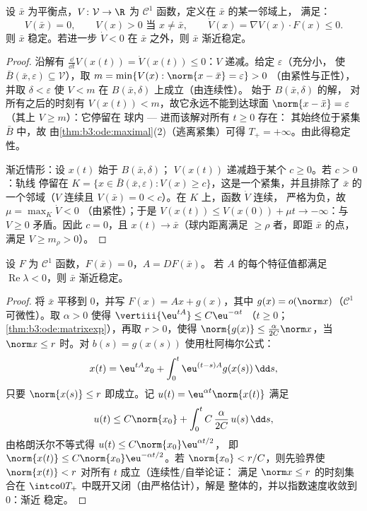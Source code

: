 \begin{theorem}[李雅普诺夫函数]\label{thm:b3:ode:lyapunov}
设 $\bar x$ 为平衡点，$V \colon \mathcal V \to
\R$ 为 $\mathcal C^1$ 函数，定义在 $\bar x$ 的某一邻域上，
满足：
\[
V(\bar x) = 0,\qquad V(x) > 0 \text{ 当 } x \neq \bar x,
\qquad \dot V(x) = \nabla V(x)\cdot F(x) \leq 0 .
\]
则 $\bar x$ 稳定。若进一步 $\dot V < 0 $ 在 $\bar
x$ 之外，则 $\bar x$ 渐近稳定。
\end{theorem}

\begin{proof}
沿解有 $\frac{\dd}{\dd t}V(x(t)) = \dot V(x(t))
\leq 0$：$V$ 递减。给定 $\varepsilon$（充分小，
使 $\bar B(\bar x, \varepsilon) \subseteq \mathcal V$），取
$m = \min\{V(x) : \norm{x - \bar x} = \varepsilon\} > 0$
（由紧性与正性），并取 $\delta < \varepsilon$
使 $V < m$ 在 $B(\bar x, \delta)$ 上成立（由连续性）。
始于 $B(\bar x, \delta)$ 的解，
对所有之后的时刻有 $V(x(t)) < m$，故它永远不能到达球面 $\norm{x -
\bar x} = \varepsilon$（其上 $V \geq m$）：它停留在
球内 --- 进而该解对所有 $t \geq 0$ 存在：
其始终位于紧集 $\bar B$ 中，故
由\cref{thm:b3:ode:maximal}(2)（逃离紧集）可得
$T_+ = +\infty$。由此得稳定性。

渐近情形：设 $x(t)$ 始于 $B(\bar x, \delta)$；
$V(x(t))$ 递减趋于某个 $c \geq 0$。若 $c > 0$：轨线
停留在 $K = \{x \in \bar B(\bar x,
\varepsilon): V(x) \geq c\}$，这是一个紧集，并且排除了
$\bar x$ 的一个邻域（$V$ 连续且 $V(\bar x)
= 0 < c$）。在 $K$ 上，函数 $\dot V$ 连续，
严格为负，故 $\mu = \max_K\dot V < 0$
（由紧性）；于是 $V(x(t)) \leq V(x(0)) + \mu t \to
-\infty$：与 $V \geq 0$ 矛盾。因此
$c = 0$，且 $x(t) \to \bar x$（球内距离满足 $\geq
\rho$ 者，即距 $\bar x$ 的点，满足 $V \geq m_\rho >
0$）。
\end{proof}

\begin{theorem}[线性化稳定性]
\label{thm:b3:ode:linearization}
设 $F$ 为 $\mathcal C^1$ 函数，$F(\bar x) = 0$，$A = DF(\bar x)$。
若 $A$ 的每个特征值都满足 $\operatorname{Re}\lambda <
0$，则 $\bar x$ 渐近稳定。
\end{theorem}

\begin{proof}
将 $\bar x$ 平移到 $0$，并写 $F(x) = Ax + g(x)$，其中
$g(x) = o(\norm x)$（$\mathcal C^1$ 可微性）。取
$\alpha > 0$ 使得 $\vertiii{\eu^{tA}} \leq C\eu^{-\alpha t}$
（$t \geq 0$；\cref{thm:b3:ode:matrixexp}），再取 $r > 0$，使得
$\norm{g(x)} \leq \frac{\alpha}{2C}\norm x$，当 $\norm x \leq
r$ 时。对 $b(s) = g(x(s))$ 使用杜阿梅尔公式：
\[
x(t) = \eu^{tA}x_0 + \int_0^t\eu^{(t-s)A}g(x(s))\,\dd s,
\]
只要 $\norm{x(s)} \leq r$ 即成立。记 $u(t) =
\eu^{\alpha t}\norm{x(t)}$ 满足
\[
u(t) \leq C\norm{x_0} +
\int_0^{t}C\,\frac{\alpha}{2C}\,u(s)\,\dd s ,
\]
由格朗沃尔不等式得 $u(t) \leq C\norm{x_0}\eu^{\alpha t/2}$，
即 $\norm{x(t)} \leq C\norm{x_0}\eu^{-\alpha t/2}$。若
$\norm{x_0} < r/C$，则先验界使 $\norm{x(t)} <
r$ 对所有 $t$ 成立（连续性/自举论证：
满足 $\norm x \leq r$ 的时刻集合在
$\intco0{T_+}$ 中既开又闭（由严格估计），解是
整体的，并以指数速度收敛到 $0$：渐近
稳定。
\end{proof}

